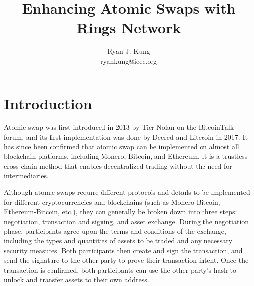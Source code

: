 \documentclass[twocolumn]{article}
\author{
  Ryan J. Kung \\ ryankung@ieee.org
}
\title{Enhancing Atomic Swaps with Rings Network}
\begin{document}
\section{Introduction}
Atomic swap was first introduced in 2013\cite{nolan2013atomic} by Tier Nolan on the BitcoinTalk forum, and its first implementation was done by Decred and Litecoin in 2017\cite{wall2017decred, biryukov2017atomic}. It has since been confirmed that atomic swap can be implemented on almost all blockchain platforms, including Monero\cite{grover2018bitcoin}, Bitcoin, and Ethereum\cite{poon2016bitcoin}. It is a trustless cross-chain method that enables decentralized trading without the need for intermediaries.

Although atomic swaps require different protocols and details to be implemented for different cryptocurrencies and blockchains (such as Monero-Bitcoin, Ethereum-Bitcoin, etc.), they can generally be broken down into three steps: negotiation, transaction and signing, and asset exchange. During the negotiation phase, participants agree upon the terms and conditions of the exchange, including the types and quantities of assets to be traded and any necessary security measures. Both participants then create and sign the transaction, and send the signature to the other party to prove their transaction intent. Once the transaction is confirmed, both participants can use the other party's hash to unlock and transfer assets to their own address.
\end{document}
